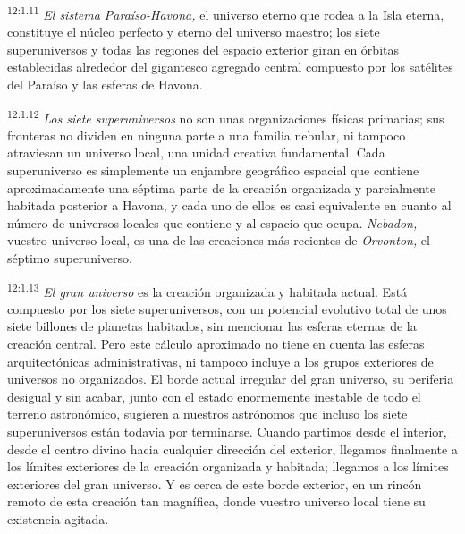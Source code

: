\par
\textsuperscript{12:1.11} \textit{El sistema Paraíso-Havona,} el universo eterno que rodea a la Isla eterna, constituye el núcleo perfecto y eterno del universo maestro; los siete superuniversos y todas las regiones del espacio exterior giran en órbitas establecidas alrededor del gigantesco agregado central compuesto por los satélites del Paraíso y las esferas de Havona.

\par
\textsuperscript{12:1.12} \textit{Los siete superuniversos} no son unas organizaciones físicas primarias; sus fronteras no dividen en ninguna parte a una familia nebular, ni tampoco atraviesan un universo local, una unidad creativa fundamental. Cada superuniverso es simplemente un enjambre geográfico espacial que contiene aproximadamente una séptima parte de la creación organizada y parcialmente habitada posterior a Havona, y cada uno de ellos es casi equivalente en cuanto al número de universos locales que contiene y al espacio que ocupa. \textit{Nebadon,} vuestro universo local, es una de las creaciones más recientes de \textit{Orvonton,} el séptimo superuniverso.

\par
\textsuperscript{12:1.13} \textit{El gran universo} es la creación organizada y habitada actual. Está compuesto por los siete superuniversos, con un potencial evolutivo total de unos siete billones de planetas habitados, sin mencionar las esferas eternas de la creación central. Pero este cálculo aproximado no tiene en cuenta las esferas arquitectónicas administrativas, ni tampoco incluye a los grupos exteriores de universos no organizados. El borde actual irregular del gran universo, su periferia desigual y sin acabar, junto con el estado enormemente inestable de todo el terreno astronómico, sugieren a nuestros astrónomos que incluso los siete superuniversos están todavía por terminarse. Cuando partimos desde el interior, desde el centro divino hacia cualquier dirección del exterior, llegamos finalmente a los límites exteriores de la creación organizada y habitada; llegamos a los límites exteriores del gran universo. Y es cerca de este borde exterior, en un rincón remoto de esta creación tan magnífica, donde vuestro universo local tiene su existencia agitada.

